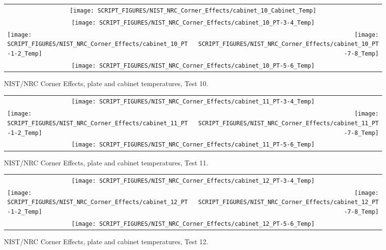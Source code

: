 \begin{figure}[p]
\begin{tabular*}{\textwidth}{l@{\extracolsep{\fill}}r}
\multicolumn{2}{c}{\texttt{[image: SCRIPT\_FIGURES/NIST\_NRC\_Corner\_Effects/cabinet\_10\_Cabinet\_Temp]}} \\
\multicolumn{2}{c}{\texttt{[image: SCRIPT\_FIGURES/NIST\_NRC\_Corner\_Effects/cabinet\_10\_PT-3-4\_Temp]}} \\
\texttt{[image: SCRIPT\_FIGURES/NIST\_NRC\_Corner\_Effects/cabinet\_10\_PT-1-2\_Temp]} &
\texttt{[image: SCRIPT\_FIGURES/NIST\_NRC\_Corner\_Effects/cabinet\_10\_PT-7-8\_Temp]} \\
\multicolumn{2}{c}{\texttt{[image: SCRIPT\_FIGURES/NIST\_NRC\_Corner\_Effects/cabinet\_10\_PT-5-6\_Temp]}}
\end{tabular*}
\caption{NIST/NRC Corner Effects, plate and cabinet temperatures, Test 10.}
\label{NIST_NRC_Cabinet_PT_Test_10}
\end{figure}

\begin{figure}[p]
\begin{tabular*}{\textwidth}{l@{\extracolsep{\fill}}r}
\multicolumn{2}{c}{\texttt{[image: SCRIPT\_FIGURES/NIST\_NRC\_Corner\_Effects/cabinet\_11\_PT-3-4\_Temp]}} \\
\texttt{[image: SCRIPT\_FIGURES/NIST\_NRC\_Corner\_Effects/cabinet\_11\_PT-1-2\_Temp]} &
\texttt{[image: SCRIPT\_FIGURES/NIST\_NRC\_Corner\_Effects/cabinet\_11\_PT-7-8\_Temp]} \\
\multicolumn{2}{c}{\texttt{[image: SCRIPT\_FIGURES/NIST\_NRC\_Corner\_Effects/cabinet\_11\_PT-5-6\_Temp]}}
\end{tabular*}
\caption{NIST/NRC Corner Effects, plate and cabinet temperatures, Test 11.}
\label{NIST_NRC_Cabinet_PT_Test_11}
\end{figure}

\begin{figure}[p]
\begin{tabular*}{\textwidth}{l@{\extracolsep{\fill}}r}
\multicolumn{2}{c}{\texttt{[image: SCRIPT\_FIGURES/NIST\_NRC\_Corner\_Effects/cabinet\_12\_PT-3-4\_Temp]}} \\
\texttt{[image: SCRIPT\_FIGURES/NIST\_NRC\_Corner\_Effects/cabinet\_12\_PT-1-2\_Temp]} &
\texttt{[image: SCRIPT\_FIGURES/NIST\_NRC\_Corner\_Effects/cabinet\_12\_PT-7-8\_Temp]} \\
\multicolumn{2}{c}{\texttt{[image: SCRIPT\_FIGURES/NIST\_NRC\_Corner\_Effects/cabinet\_12\_PT-5-6\_Temp]}}
\end{tabular*}
\caption{NIST/NRC Corner Effects, plate and cabinet temperatures, Test 12.}
\label{NIST_NRC_Cabinet_PT_Test_12}
\end{figure}


